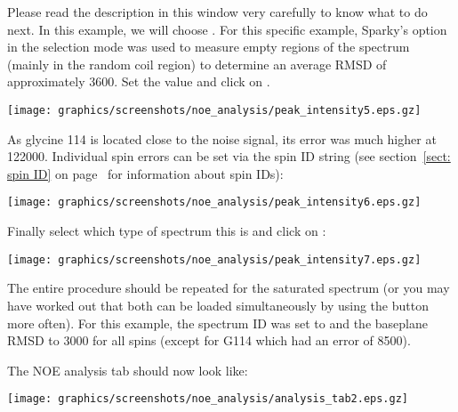 Please read the description in this window very carefully to know what to do next.  In this example, we will choose .  For this specific example, Sparky's  option in the  selection mode was used to measure empty regions of the spectrum (mainly in the random coil region) to determine an average RMSD of approximately 3600.  Set the value and click on .

\begin{minipage}[h]{\linewidth}
\centerline{\texttt{[image: graphics/screenshots/noe\_analysis/peak\_intensity5.eps.gz]}}
\end{minipage}

As glycine 114 is located close to the noise signal, its error was much higher at 122000.  Individual spin errors can be set via the spin ID string (see section~\ref{sect: spin ID} on page~\pageref{sect: spin ID} for information about spin IDs):

\begin{minipage}[h]{\linewidth}
\centerline{\texttt{[image: graphics/screenshots/noe\_analysis/peak\_intensity6.eps.gz]}}
\end{minipage}

Finally select which type of spectrum this is and click on :

\begin{minipage}[h]{\linewidth}
\centerline{\texttt{[image: graphics/screenshots/noe\_analysis/peak\_intensity7.eps.gz]}}
\end{minipage}

The entire procedure should be repeated for the saturated spectrum (or you may have worked out that both can be loaded simultaneously by using the  button more often).  For this example, the spectrum ID was set to  and the baseplane RMSD to 3000 for all spins (except for G114 which had an error of 8500).

The NOE analysis tab should now look like:

\begin{minipage}[h]{\linewidth}
\centerline{\texttt{[image: graphics/screenshots/noe\_analysis/analysis\_tab2.eps.gz]}}
\end{minipage}




